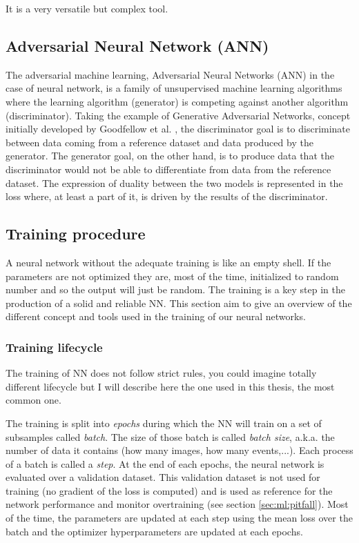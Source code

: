 \documentclass[../main.tex]{subfiles}
\begin{document}
It is a very versatile but complex tool.

\subsection{Adversarial Neural Network (ANN)}

The adversarial machine learning, Adversarial Neural Networks (ANN) in the case of neural network, is a family of unsupervised machine learning algorithms where the learning algorithm (generator) is competing against another algorithm (discriminator). Taking the example of Generative Adversarial Networks, concept initially developed by Goodfellow et al. \cite{goodfellow_generative_2014}, the discriminator goal is to discriminate between data coming from a reference dataset and data produced by the generator.
The generator goal, on the other hand, is to produce data that the discriminator would not be able to differentiate from data from the reference dataset. The expression of duality between the two models is represented in the loss where, at least a part of it, is driven by the results of the discriminator.

\subsection{Training procedure}
\label{sec:ml:train}

A neural network without the adequate training is like an empty shell. If the parameters are not optimized they are, most of the time, initialized to random number and so the output will just be random. The training is a key step in the production of a solid and reliable NN. This section aim to give an overview of the different concept and tools used in the training of our neural networks.

\subsubsection{Training lifecycle}

The training of NN does not follow strict rules, you could imagine totally different lifecycle but I will describe here the one used in this thesis, the most common one.

The training is split into \textit{epochs} during which the NN will train on a set of subsamples called \textit{batch}. The size of those batch is called \textit{batch size}, a.k.a. the number of data it contains (how many images, how many events,...). Each process of a batch is called a \textit{step}. At the end of each epochs, the neural network is evaluated over a validation dataset. This validation dataset is not used for training (no gradient of the loss is computed) and is used as reference for the network performance and monitor overtraining (see section \ref{sec:ml:pitfall}). Most of the time, the parameters are updated at each step using the mean loss over the batch and the optimizer hyperparameters are updated at each epochs.
\end{document}
